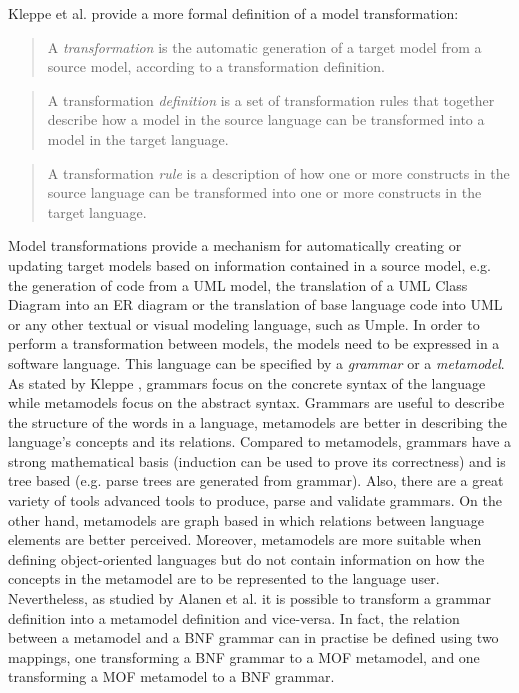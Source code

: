 Kleppe et al. \cite{mccKleppe} provide a more formal definition of a model transformation:
\begin{quote}
A \textit{transformation} is the automatic generation of a target model from a source model, according to a transformation definition. 
\end{quote}
\begin{quote}
A transformation \textit{definition} is a set of transformation rules that together describe how a model in the source language can be transformed into a model in the target language.
\end{quote}
\begin{quote}
A transformation \textit{rule} is a description of how one or more constructs in the source language can be transformed into one or more constructs in the target language.
\end{quote}

Model transformations provide a mechanism for automatically creating or updating target models based on information contained in a source model, e.g. the generation of code from a UML model, the translation of a UML Class Diagram into an ER diagram or the translation of base language code into UML or any other textual or visual modeling language, such as Umple.
In order to perform a transformation between models, the models need to be expressed in a software language. This language can be specified by a \textit{grammar} or a \textit{metamodel}. As stated by Kleppe \cite{kleppe2007language}, grammars focus on the concrete syntax of the language while metamodels focus on the abstract syntax. Grammars are useful to describe the structure of the words in a language, metamodels are better in describing the language's concepts and its relations. Compared to metamodels, grammars have a strong mathematical basis (induction can be used to prove its correctness) and is tree based (e.g. parse trees are generated from grammar). Also, there are a great variety of tools advanced tools to produce, parse and validate grammars. On the other hand, metamodels are graph based in which relations between language elements are better perceived. Moreover, metamodels are more suitable when defining object-oriented languages but do not contain information on how the concepts in the metamodel are to be represented to the language user\cite{kleppe2007language}. Nevertheless, as studied by Alanen et al. \cite{alanen2003} it is possible to transform a grammar definition into a metamodel definition and vice-versa. In fact, the relation between a metamodel and a BNF grammar can in practise be defined using two mappings, one transforming a BNF grammar to a MOF metamodel,
and one transforming a MOF metamodel to a BNF grammar.

